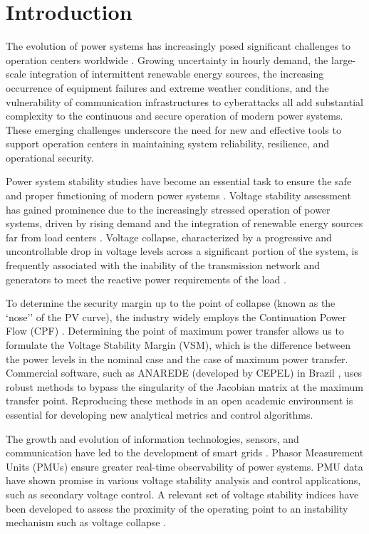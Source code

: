 \documentclass[conference]{IEEEtran}
\begin{document}
\section{Introduction}
\label{sec:introduction}
The evolution of power systems has increasingly posed significant challenges to operation centers worldwide \cite{Bhusal2020}. Growing uncertainty in hourly demand, the large-scale integration of intermittent renewable energy sources, the increasing occurrence of equipment failures and extreme weather conditions, and the vulnerability of communication infrastructures to cyberattacks all add substantial complexity to the continuous and secure operation of modern power systems. These emerging challenges underscore the need for new and effective tools to support operation centers in maintaining system reliability, resilience, and operational security.

Power system stability studies have become an essential task to ensure the safe and proper functioning of modern power systems \cite{Hatziargyriou2021}. Voltage stability assessment has gained prominence due to the increasingly stressed operation of power systems, driven by rising demand and the integration of renewable energy sources far from load centers \cite{Sun2019}. Voltage collapse, characterized by a progressive and uncontrollable drop in voltage levels across a significant portion of the system, is frequently associated with the inability of the transmission network and generators to meet the reactive power requirements of the load \cite{kundur1994power}.

To determine the security margin up to the point of collapse (known as the `nose'' of the PV curve), the industry widely employs the Continuation Power Flow (CPF) \cite{Ajjarapu1992}. Determining the point of maximum power transfer allows us to formulate the Voltage Stability Margin (VSM), which is the difference between the power levels in the nominal case and the case of maximum power transfer. Commercial software, such as ANAREDE (developed by CEPEL) in Brazil \cite{cepel2009anarede}, uses robust methods to bypass the singularity of the Jacobian matrix at the maximum transfer point. Reproducing these methods in an open academic environment is essential for developing new analytical metrics and control algorithms. 

The growth and evolution of information technologies, sensors, and communication have led to the development of smart grids \cite{Li2010}. Phasor Measurement Units (PMUs) ensure greater real-time observability of power systems. PMU data have shown promise in various voltage stability analysis and control applications, such as secondary voltage control. A relevant set of voltage stability indices have been developed to assess the proximity of the operating point to an instability mechanism such as voltage collapse \cite{modarresi2016comprehensive}.
\end{document}
